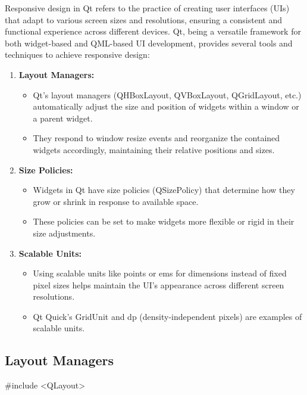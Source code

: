 \documentclass{report}
\begin{document}
    \pagebreak 
    \bigbreak \noindent 
    \begin{concept}
       Responsive design in Qt refers to the practice of creating user interfaces (UIs) that adapt to various screen sizes and resolutions, ensuring a consistent and functional experience across different devices. Qt, being a versatile framework for both widget-based and QML-based UI development, provides several tools and techniques to achieve responsive design: 
    \end{concept}
    \begin{enumerate}
        \item \textbf{Layout Managers:}
            \begin{itemize}
                \item Qt's layout managers (QHBoxLayout, QVBoxLayout, QGridLayout, etc.) automatically adjust the size and position of widgets within a window or a parent widget.
                \item They respond to window resize events and reorganize the contained widgets accordingly, maintaining their relative positions and sizes.
           \end{itemize}
       \item \textbf{Size Policies:}
           \begin{itemize}
               \item Widgets in Qt have size policies (QSizePolicy) that determine how they grow or shrink in response to available space.
               \item These policies can be set to make widgets more flexible or rigid in their size adjustments.
           \end{itemize}
       \item \textbf{Scalable Units:}
           \begin{itemize}
               \item Using scalable units like points or ems for dimensions instead of fixed pixel sizes helps maintain the UI's appearance across different screen resolutions.
               \item Qt Quick's GridUnit and dp (density-independent pixels) are examples of scalable units.
           \end{itemize}
    \end{enumerate}

    \bigbreak \noindent 
    \subsection{Layout Managers}
    \bigbreak \noindent 
    \begin{cppcode}
    #include <QLayout>
    \end{cppcode}
    \bigbreak \noindent 
\end{document}
